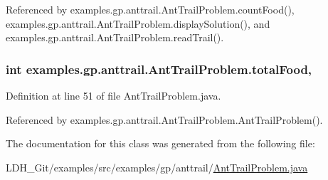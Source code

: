 Referenced by examples.\-gp.\-anttrail.\-Ant\-Trail\-Problem.\-count\-Food(), examples.\-gp.\-anttrail.\-Ant\-Trail\-Problem.\-display\-Solution(), and examples.\-gp.\-anttrail.\-Ant\-Trail\-Problem.\-read\-Trail().

\hypertarget{classexamples_1_1gp_1_1anttrail_1_1_ant_trail_problem_a12541a40eb03cb354f1574947d6f597e}{
\subsubsection[{total\-Food}]{\setlength{\rightskip}{0pt plus 5cm}int examples.\-gp.\-anttrail.\-Ant\-Trail\-Problem.\-total\-Food\hspace{0.3cm}{\ttfamily [static]}, {\ttfamily [protected]}}}\label{classexamples_1_1gp_1_1anttrail_1_1_ant_trail_problem_a12541a40eb03cb354f1574947d6f597e}


Definition at line 51 of file Ant\-Trail\-Problem.\-java.



Referenced by examples.\-gp.\-anttrail.\-Ant\-Trail\-Problem.\-Ant\-Trail\-Problem().



The documentation for this class was generated from the following file\-:\begin{DoxyCompactItemize}
\item 
L\-D\-H\-\_\-\-Git/examples/src/examples/gp/anttrail/\hyperlink{_ant_trail_problem_8java}{Ant\-Trail\-Problem.\-java}\end{DoxyCompactItemize}
